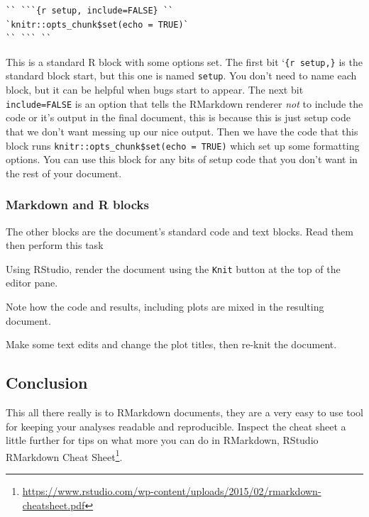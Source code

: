 \documentclass[
]{book}
\renewcommand{\href}[2]{#2\footnote{\url{#1}}}
\newenvironment{task}
{ \begin{tcolorbox}[title=For you to do,title filled] }
{  \end{tcolorbox} }
\begin{document}
\begin{verbatim}
`` ```{r setup, include=FALSE} ``
`knitr::opts_chunk$set(echo = TRUE)`
`` ``` ``
\end{verbatim}

This is a standard R block with some options set. The first bit `\texttt{\textasciigrave{}\textasciigrave{}\textasciigrave{}\{r\ setup,\}} is the standard block start, but this one is named \texttt{setup}. You don't need to name each block, but it can be helpful when bugs start to appear. The next bit \texttt{include=FALSE} is an option that tells the RMarkdown renderer \emph{not} to include the code or it's output in the final document, this is because this is just setup code that we don't want messing up our nice output. Then we have the code that this block runs \texttt{knitr::opts\_chunk\$set(echo\ =\ TRUE)} which set up some formatting options. You can use this block for any bits of setup code that you don't want in the rest of your document.

\hypertarget{markdown-and-r-blocks}{%
\subsubsection{Markdown and R blocks}\label{markdown-and-r-blocks}}

The other blocks are the document's standard code and text blocks. Read them then perform this task

\begin{task}
Using RStudio, render the document using the \texttt{Knit} button at the top of the editor pane.
\end{task}

Note how the code and results, including plots are mixed in the resulting document.

\begin{task}
Make some text edits and change the plot titles, then re-knit the document.
\end{task}

\hypertarget{conclusion}{%
\subsection{Conclusion}\label{conclusion}}

This all there really is to RMarkdown documents, they are a very easy to use tool for keeping your analyses readable and reproducible. Inspect the cheat sheet a little further for tips on what more you can do in RMarkdown, \href{https://www.rstudio.com/wp-content/uploads/2015/02/rmarkdown-cheatsheet.pdf}{RStudio RMarkdown Cheat Sheet}.
\end{document}
